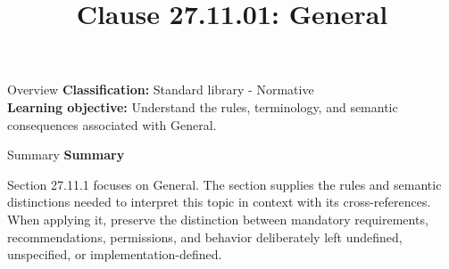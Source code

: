 \documentclass[10pt,letterpaper]{article}
\title{Clause 27.11.01: General}
\author{}
\date{}
\begin{document}
\maketitle
\begin{CornellOverviewBox}{Overview}
\textbf{Classification:} Standard library - Normative\\[2pt]
\textbf{Learning objective:} Understand the rules, terminology, and semantic consequences associated with General.
\end{CornellOverviewBox}\begin{CornellSummaryBox}{Summary}
{\sffamily\bfseries\color{Accent} Summary}\par\vspace{3pt}Section 27.11.1 focuses on General. The section supplies the rules and semantic distinctions needed to interpret this topic in context with its cross-references. When applying it, preserve the distinction between mandatory requirements, recommendations, permissions, and behavior deliberately left undefined, unspecified, or implementation-defined.
\end{CornellSummaryBox}
\end{document}
